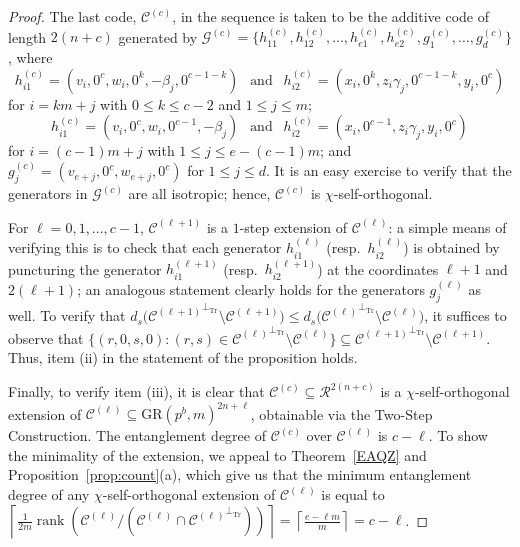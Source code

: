 \documentclass{article}
\DeclareMathOperator{\Tr}{Tr}
\DeclareMathOperator{\rank}{rank}
\theoremstyle{remark}
\theoremstyle{definition}
\numberwithin{equation}{section}
\begin{document}
\begin{proof}
The last code, $\mathcal{C}^{(c)}$, in the sequence is taken to be the additive code of length $2(n+c)$ generated by $\mathcal{G}^{(c)} = \{h^{(c)}_{11},h^{(c)}_{12},\ldots, h^{(c)}_{e1},h^{(c)}_{e2},g^{(c)}_1,\ldots,g^{(c)}_d\}$, where
$$
h^{(c)}_{i1} = (v_i,0^{c},w_i,0^k,-\beta_j,0^{c-1-k}) \ \ \text{ and } \ \ h^{(c)}_{i2} = (x_i,0^{k}, z_i \gamma_j,0^{c-1-k}, y_i,0^{c})
$$
for $i = km+j$ with $0 \le k \le c-2$ and $1 \le j \le m$; 
$$
h^{(c)}_{i1} = (v_i,0^{c},w_i,0^{c-1},-\beta_j) \ \ \text{ and } \ \ h^{(c)}_{i2} = (x_i,0^{c-1}, z_i \gamma_j,y_i,0^{c})
$$
for $i = (c-1)m+j$ with $1 \le j \le e-(c-1)m$; and $g^{(c)}_j = (v_{e+j},0^{c},w_{e+j},0^{c})$ for $1 \le j \le d$.
It is an easy exercise to verify that the generators in $\mathcal{G}^{(c)}$ are all isotropic; hence, $\mathcal{C}^{(c)}$ is $\chi$-self-orthogonal. 

For $\ell = 0,1,\ldots,c-1$, $\mathcal{C}^{(\ell+1)}$ is a $1$-step extension of $\mathcal{C}^{(\ell)}$: a simple means of verifying this is to check that each generator $h_{i1}^{(\ell)}$ (resp.\ $h_{i2}^{(\ell)}$) is obtained by puncturing the generator $h_{i1}^{(\ell+1)}$ (resp.\ $h_{i2}^{(\ell+1)}$) at the coordinates $\ell+1$ and $2(\ell+1)$; an analogous statement clearly holds for the generators $g_j^{(\ell)}$ as well. To verify that $d_s\bigl({\mathcal{C}^{(\ell+1)}}^{\perp_{\Tr}} \setminus \mathcal{C}^{(\ell+1)}\bigr) \le d_s\bigl({\mathcal{C}^{(\ell)}}^{\perp_{\Tr}} \setminus \mathcal{C}^{(\ell)}\bigr)$, it suffices to observe that $\{(r,0,s,0) : (r,s) \in {\mathcal{C}^{(\ell)}}^{\perp_{\Tr}}  \setminus \mathcal{C}^{(\ell)}\} \subseteq {\mathcal{C}^{(\ell+1)}}^{\perp_{\Tr}} \setminus \mathcal{C}^{(\ell+1)}$. Thus, item (ii) in the statement of the proposition holds.

Finally, to verify item (iii), it is clear that $\mathcal{C}^{(c)} \subseteq \mathcal{R}^{2(n+c)}$ is a $\chi$-self-orthogonal extension of $\mathcal{C}^{(\ell)} \subseteq \text{GR}(p^b,m)^{2{n+\ell}}$, obtainable via the Two-Step Construction. The entanglement degree of $\mathcal{C}^{(c)}$ over $\mathcal{C}^{(\ell)}$ is $c-\ell$. To show the minimality of the extension, we appeal to Theorem~\ref{EAQZ} and Proposition~\ref{prop:count}(a), which give us that the minimum entanglement degree of any $\chi$-self-orthogonal extension of $\mathcal{C}^{(\ell)}$ is equal to $\left\lceil { \frac{1}{2m} \rank(\mathcal{C}^{(\ell)}/(\mathcal{C}^{(\ell)} \cap{\mathcal{C}^{(\ell)}}^{\perp_{\Tr}}))  }\right\rceil=\left\lceil  \frac{e-\ell m}{m}\right\rceil=c-\ell$. 
\end{proof}
\end{document}

